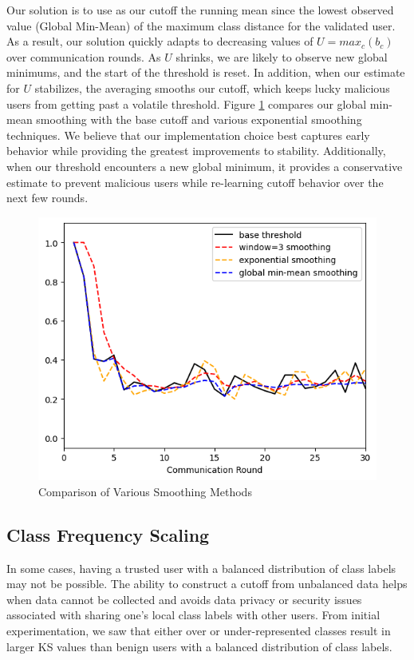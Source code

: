 \documentclass{article} %
\begin{document}
Our solution is to use as our cutoff the running mean since the lowest observed value (Global Min-Mean) of the maximum class distance for the validated user. As a result, our solution quickly adapts to decreasing values of $U = max_c (b_c)$ over communication rounds. As $U$ shrinks, we are likely to observe new global minimums, and the start of the threshold is reset. In addition, when our estimate for $U$ stabilizes, the averaging smooths our cutoff, which keeps lucky malicious users from getting past a volatile threshold. Figure \ref{fig:min-mean} compares our global min-mean smoothing with the base cutoff and various exponential smoothing techniques. We believe that our implementation choice best captures early behavior while providing the greatest improvements to stability. Additionally, when our threshold encounters a new global minimum, it provides a conservative estimate to prevent malicious users while re-learning cutoff behavior over the next few rounds.

\begin{figure}[H]
    \centering
    \includegraphics[width=\textwidth]{99_article/99_visuals/extra_plots/min_mean--alpha10000--alpha_val10000--d_rounds30.png}
    \caption{Comparison of Various Smoothing Methods}
    \label{fig:min-mean}
\end{figure}

%
\subsection{Class Frequency Scaling}

In some cases, having a trusted user with a balanced distribution of class labels may not be possible. The ability to construct a cutoff from unbalanced data helps when data cannot be collected and avoids data privacy or security issues associated with sharing one's local class labels with other users. From initial experimentation, we saw that either over or under-represented classes result in larger KS values than benign users with a balanced distribution of class labels. 
\end{document}
